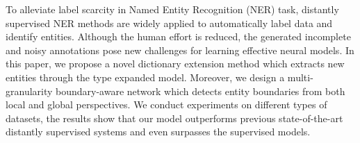 To alleviate label scarcity in Named Entity Recognition (NER) task, distantly supervised NER methods are widely applied to automatically label data and identify entities. Although the human effort is reduced, the generated incomplete and noisy annotations pose new challenges for learning effective neural models. In this paper, we propose a novel dictionary extension method which extracts new entities through the type expanded model. Moreover, we design a multi-granularity boundary-aware network which detects entity boundaries from both local and global perspectives. We conduct experiments on different types of datasets, the results show that our model outperforms previous state-of-the-art distantly supervised systems and even surpasses the supervised models.
